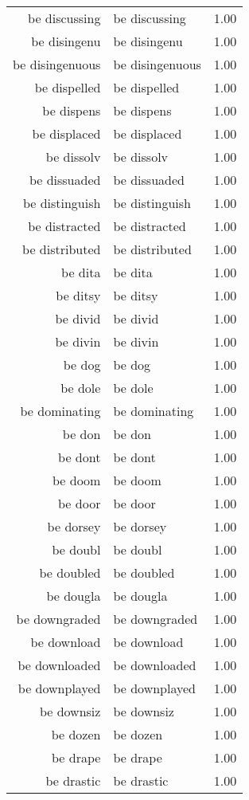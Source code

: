 \begin{table}[ht]
\begin{tabular}{rlr}
  be discussing & be discussing & 1.00 \\ 
  be disingenu & be disingenu & 1.00 \\ 
  be disingenuous & be disingenuous & 1.00 \\ 
  be dispelled & be dispelled & 1.00 \\ 
  be dispens & be dispens & 1.00 \\ 
  be displaced & be displaced & 1.00 \\ 
  be dissolv & be dissolv & 1.00 \\ 
  be dissuaded & be dissuaded & 1.00 \\ 
  be distinguish & be distinguish & 1.00 \\ 
  be distracted & be distracted & 1.00 \\ 
  be distributed & be distributed & 1.00 \\ 
  be dita & be dita & 1.00 \\ 
  be ditsy & be ditsy & 1.00 \\ 
  be divid & be divid & 1.00 \\ 
  be divin & be divin & 1.00 \\ 
  be dog & be dog & 1.00 \\ 
  be dole & be dole & 1.00 \\ 
  be dominating & be dominating & 1.00 \\ 
  be don & be don & 1.00 \\ 
  be dont & be dont & 1.00 \\ 
  be doom & be doom & 1.00 \\ 
  be door & be door & 1.00 \\ 
  be dorsey & be dorsey & 1.00 \\ 
  be doubl & be doubl & 1.00 \\ 
  be doubled & be doubled & 1.00 \\ 
  be dougla & be dougla & 1.00 \\ 
  be downgraded & be downgraded & 1.00 \\ 
  be download & be download & 1.00 \\ 
  be downloaded & be downloaded & 1.00 \\ 
  be downplayed & be downplayed & 1.00 \\ 
  be downsiz & be downsiz & 1.00 \\ 
  be dozen & be dozen & 1.00 \\ 
  be drape & be drape & 1.00 \\ 
  be drastic & be drastic & 1.00 \\ 

\end{tabular}
\end{table}
